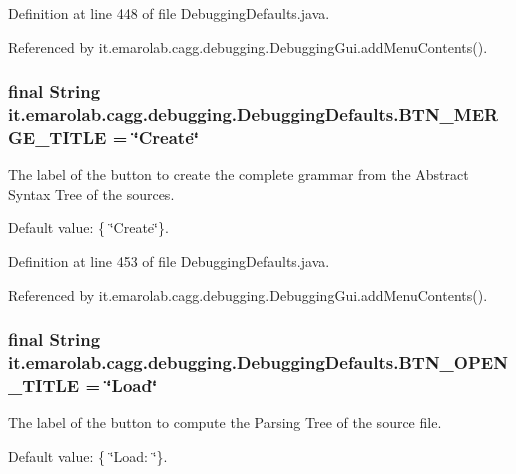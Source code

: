 Definition at line 448 of file Debugging\-Defaults.\-java.



Referenced by it.\-emarolab.\-cagg.\-debugging.\-Debugging\-Gui.\-add\-Menu\-Contents().

\hypertarget{classit_1_1emarolab_1_1cagg_1_1debugging_1_1DebuggingDefaults_ad7bc45e0aa6ad8b1eed719694d692058}{
\subsubsection[{B\-T\-N\-\_\-\-M\-E\-R\-G\-E\-\_\-\-T\-I\-T\-L\-E}]{\setlength{\rightskip}{0pt plus 5cm}final String it.\-emarolab.\-cagg.\-debugging.\-Debugging\-Defaults.\-B\-T\-N\-\_\-\-M\-E\-R\-G\-E\-\_\-\-T\-I\-T\-L\-E = \char`\"{}Create\char`\"{}\hspace{0.3cm}{\ttfamily [static]}}}\label{classit_1_1emarolab_1_1cagg_1_1debugging_1_1DebuggingDefaults_ad7bc45e0aa6ad8b1eed719694d692058}
The label of the button to create the complete grammar from the Abstract Syntax Tree of the sources. \par
 Default value\-: \{ \char`\"{}\-Create\char`\"{}\}. 

Definition at line 453 of file Debugging\-Defaults.\-java.



Referenced by it.\-emarolab.\-cagg.\-debugging.\-Debugging\-Gui.\-add\-Menu\-Contents().

\hypertarget{classit_1_1emarolab_1_1cagg_1_1debugging_1_1DebuggingDefaults_a1c9cdb4b1c13ebc155d1208725aa14b2}{
\subsubsection[{B\-T\-N\-\_\-\-O\-P\-E\-N\-\_\-\-T\-I\-T\-L\-E}]{\setlength{\rightskip}{0pt plus 5cm}final String it.\-emarolab.\-cagg.\-debugging.\-Debugging\-Defaults.\-B\-T\-N\-\_\-\-O\-P\-E\-N\-\_\-\-T\-I\-T\-L\-E = \char`\"{}Load\char`\"{}\hspace{0.3cm}{\ttfamily [static]}}}\label{classit_1_1emarolab_1_1cagg_1_1debugging_1_1DebuggingDefaults_a1c9cdb4b1c13ebc155d1208725aa14b2}
The label of the button to compute the Parsing Tree of the source file. \par
 Default value\-: \{ \char`\"{}\-Load\-: \char`\"{}\}. 

